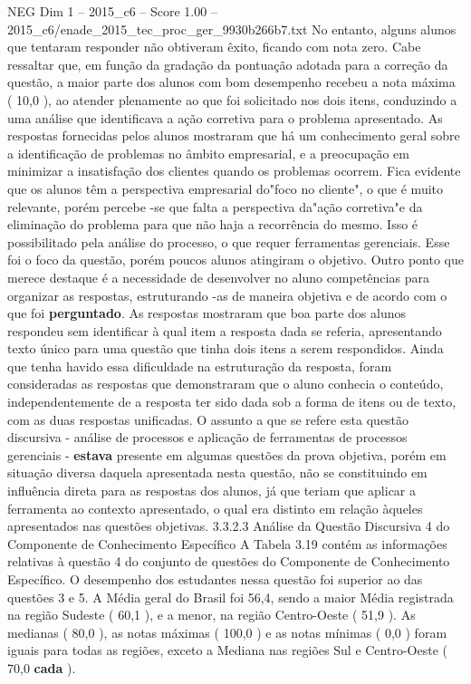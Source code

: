 \begin{textsample}{NEG Dim 1 – 2015\_c6 – Score 1.00 – 2015\_c6/enade\_2015\_tec\_proc\_ger\_9930b266b7.txt}
No entanto, alguns alunos que tentaram responder não obtiveram êxito, ficando com nota zero.
Cabe ressaltar que, em função da gradação da pontuação adotada para a correção da questão, a maior parte dos alunos com bom desempenho recebeu a nota máxima ( 10,0 ), ao atender plenamente ao que foi solicitado nos dois itens, conduzindo a uma análise que identificava a ação corretiva para o problema apresentado.
As respostas fornecidas pelos alunos mostraram que há um conhecimento geral sobre a identificação de problemas no âmbito empresarial, e a preocupação em minimizar a insatisfação dos clientes quando os problemas ocorrem.
Fica evidente que os alunos têm a perspectiva empresarial do"foco no cliente", o que é muito relevante, porém percebe -se que falta a perspectiva da"ação corretiva"e da eliminação do problema para que não haja a recorrência do mesmo.
Isso é possibilitado pela análise do processo, o que requer ferramentas gerenciais.
Esse foi o foco da questão, porém poucos alunos atingiram o objetivo.
Outro ponto que merece destaque é a necessidade de desenvolver no aluno competências para organizar as respostas, estruturando -as de maneira objetiva e de acordo com o que foi \textbf{perguntado}.
As respostas mostraram que boa parte dos alunos respondeu sem identificar à qual item a resposta dada se referia, apresentando texto único para uma questão que tinha dois itens a serem respondidos.
Ainda que tenha havido essa dificuldade na estruturação da resposta, foram consideradas as respostas que demonstraram que o aluno conhecia o conteúdo, independentemente de a resposta ter sido dada sob a forma de itens ou de texto, com as duas respostas unificadas.
O assunto a que se refere esta questão discursiva - análise de processos e aplicação de ferramentas de processos gerenciais - \textbf{estava} presente em algumas questões da prova objetiva, porém em situação diversa daquela apresentada nesta questão, não se constituindo em influência direta para as respostas dos alunos, já que teriam que aplicar a ferramenta ao contexto apresentado, o qual era distinto em relação àqueles apresentados nas questões objetivas. 3.3.2.3 Análise da Questão Discursiva 4 do Componente de Conhecimento Específico A Tabela 3.19 contém as informações relativas à questão 4 do conjunto de questões do Componente de Conhecimento Específico.
O desempenho dos estudantes nessa questão foi superior ao das questões 3 e 5.
A Média geral do Brasil foi 56,4, sendo a maior Média registrada na região Sudeste ( 60,1 ), e a menor, na região Centro-Oeste ( 51,9 ).
As medianas ( 80,0 ), as notas máximas ( 100,0 ) e as notas mínimas ( 0,0 ) foram iguais para todas as regiões, exceto a Mediana nas regiões Sul e Centro-Oeste ( 70,0 \textbf{cada} ).

\end{textsample}

